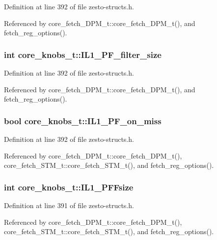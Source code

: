 Definition at line 392 of file zesto-structs.h.

Referenced by core\_\-fetch\_\-DPM\_\-t::core\_\-fetch\_\-DPM\_\-t(), and fetch\_\-reg\_\-options().
\subsubsection[{IL1\_\-PF\_\-filter\_\-size}]{\setlength{\rightskip}{0pt plus 5cm}int {\bf core\_\-knobs\_\-t::IL1\_\-PF\_\-filter\_\-size}}\label{structcore__knobs__t_962b825c4cd53d2b10018d3b05b640dd}




Definition at line 392 of file zesto-structs.h.

Referenced by core\_\-fetch\_\-DPM\_\-t::core\_\-fetch\_\-DPM\_\-t(), and fetch\_\-reg\_\-options().
\subsubsection[{IL1\_\-PF\_\-on\_\-miss}]{\setlength{\rightskip}{0pt plus 5cm}bool {\bf core\_\-knobs\_\-t::IL1\_\-PF\_\-on\_\-miss}}\label{structcore__knobs__t_36cab48af1002b118cb1700cfb990d94}




Definition at line 392 of file zesto-structs.h.

Referenced by core\_\-fetch\_\-DPM\_\-t::core\_\-fetch\_\-DPM\_\-t(), core\_\-fetch\_\-STM\_\-t::core\_\-fetch\_\-STM\_\-t(), and fetch\_\-reg\_\-options().
\subsubsection[{IL1\_\-PFFsize}]{\setlength{\rightskip}{0pt plus 5cm}int {\bf core\_\-knobs\_\-t::IL1\_\-PFFsize}}\label{structcore__knobs__t_6c641f632eb1cba75d889c550f8b4355}




Definition at line 391 of file zesto-structs.h.

Referenced by core\_\-fetch\_\-DPM\_\-t::core\_\-fetch\_\-DPM\_\-t(), core\_\-fetch\_\-STM\_\-t::core\_\-fetch\_\-STM\_\-t(), and fetch\_\-reg\_\-options().
